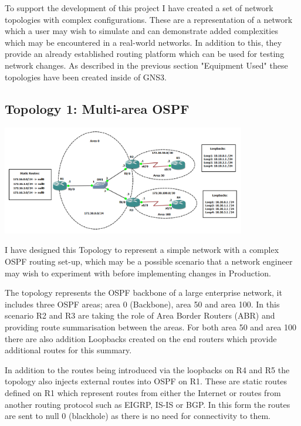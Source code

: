 \documentclass[11pt]{report}
\begin{document}
To support the development of this project I have created a set of network topologies with complex configurations. These are a representation of a network which a user may wish to simulate and can demonstrate added complexities which may be encountered in a real-world networks. In addition to this, they provide an already established routing platform which can be used for testing network changes. As described in the previous section "Equipment Used" these topologies have been created inside of GNS3.

\subsection{Topology 1: Multi-area OSPF}

\begin{center}
\includegraphics[width=0.8\textwidth]{OSPF-Topology.png}
\end{center}

I have designed this Topology to represent a simple network with a complex OSPF routing set-up, which may be a possible scenario that a network engineer may wish to experiment with before implementing changes in Production.

The topology represents the OSPF backbone of a large enterprise network, it includes three OSPF areas; area 0 (Backbone), area 50 and area 100. In this scenario R2 and R3 are taking the role of Area Border Routers (ABR) and providing route summarisation between the areas. For both area 50 and area 100 there are also addition Loopbacks created on the end routers which provide additional routes for this summary.

In addition to the routes being introduced via the loopbacks on R4 and R5 the topology also injects external routes into OSPF on R1. These are static routes defined on R1 which represent routes from either the Internet or routes from another routing protocol such as EIGRP, IS-IS or BGP. In this form the routes are sent to null 0 (blackhole) as there is no need for connectivity to them.
\end{document}

